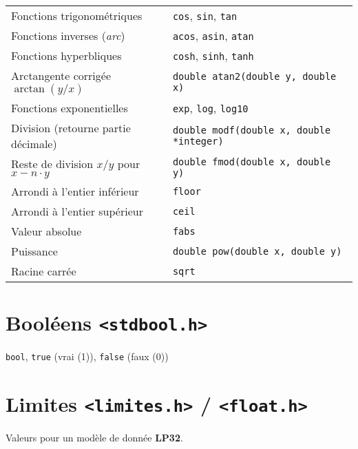 \documentclass{article}
\newcommand{\cd}{\lstinline}
\begin{document}
\begin{multicols*}{3}
\begin{tabularx}{\linewidth}{Xl}
  Fonctions trigonométriques & \cd{cos}, \cd{sin}, \cd{tan} \\
  Fonctions inverses (\emph{arc}) & \cd{acos}, \cd{asin}, \cd{atan} \\
  Fonctions hyperbliques & \cd{cosh}, \cd{sinh}, \cd{tanh} \\
  Arctangente corrigée $\arctan(y / x)$ & \cd{double atan2(double y, double x)} \\
  Fonctions exponentielles & \cd{exp}, \cd{log}, \cd{log10} \\
  Division (retourne partie décimale) & \cd{double modf(double x, double *integer)} \\
  Reste de division $x/y$ pour $x - n \cdot y$ & \cd{double fmod(double x, double y)} \\
  Arrondi à l'entier inférieur & \cd{floor} \\
  Arrondi à l'entier supérieur & \cd{ceil} \\
  Valeur absolue & \cd{fabs} \\
  Puissance & \cd{double pow(double x, double y)} \\
  Racine carrée & \cd{sqrt} \\
\end{tabularx}

\section*{Booléens \texttt{<stdbool.h>}}

\cd{bool}, \cd{true} (vrai (1)), \cd{false} (faux (0))

\section*{Limites \texttt{<limites.h>} / \texttt{<float.h>}}

Valeurs pour un modèle de donnée \textbf{LP32}.


\end{multicols*}
\end{document}
